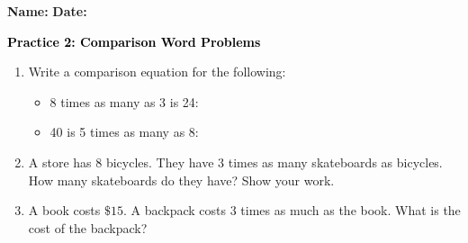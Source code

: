 \documentclass[12pt, letterpaper, fleqn]{article}
\newcommand{\blanklong}{\underline{\hspace{6.5cm}}}
\begin{document}
\textbf{Name:} \underline{\hspace{5cm}}
\hfill
\textbf{Date:} \underline{\hspace{3cm}}\\

\begin{tcolorbox}[colback=customteal!20]
    \large\textcolor{black}{\textbf{Practice 2: Comparison Word Problems}}
\end{tcolorbox}

\vspace{5mm}
\begin{enumerate}[itemsep=3cm, leftmargin=0.6cm]
\item Write a comparison equation for the following:
  \begin{itemize}[itemsep=0.8cm]
    \item 8 times as many as 3 is 24: \blanklong
    \item 40 is 5 times as many as 8: \blanklong
  \end{itemize}

\item A store has 8 bicycles. They have 3 times as many skateboards as bicycles. How many skateboards do they have? Show your work.
\vspace{3.5cm}

\item A book costs $\$15$. A backpack costs 3 times as much as the book. What is the cost of the backpack?
\end{enumerate}
\end{document}
